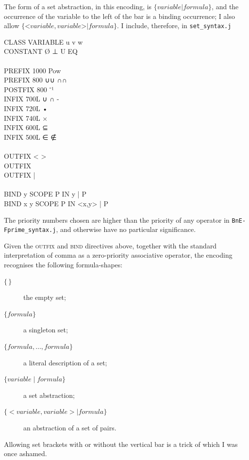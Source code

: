 The form of a set abstraction, in this encoding, is $\{ \mathit{variable} | \mathit{formula} \}$, and the occurrence of the variable to the left of the bar is a binding occurrence; I also allow $\{ \texttt{<}\mathit{variable},\mathit{variable}\texttt{>} | \mathit{formula} \}$. I include, therefore, in \texttt{set\_syntax.j}
\begin{japeish}
CLASS VARIABLE u v w \\
CONSTANT Ø ⊥ U EQ \\
\\
PREFIX  1000            Pow \\
PREFIX  800             ∪∪ ∩∩ \\
POSTFIX 800             ⁻¹ \\
INFIX           700L            ∪ ∩ - \\
INFIX           720L            • \\
INFIX           740L            × \\
INFIX           600L            ⊆ \\
INFIX           500L            ∈ ∉ \\
\\
OUTFIX < > \\
OUTFIX { } \\
OUTFIX { | } \\
 \\
BIND y SCOPE P IN { y | P } \\
BIND x y SCOPE P IN { <x,y> | P }
\end{japeish}
The priority numbers chosen are higher than the priority of any operator in \texttt{BnE-Fprime\_syntax.j}, and otherwise have no particular significance. 

Given the \textsc{outfix} and \textsc{bind} directives above, together with the standard interpretation of comma as a zero-priority associative operator, the encoding recognises the following formula-shapes:
\begin{description}
\item[$\{\,\}$] the empty set;
\item[$\{ \mathit{formula} \}$] a singleton set;
\item[$\{ \mathit{formula},\dots,\mathit{formula} \}$] a literal description of a set;
\item[$\{ \mathit{variable} \mid \mathit{formula} \}$] a set abstraction;
\item[$\{ <\!\mathit{variable}, \mathit{variable}\!> \mid \mathit{formula} \}$] an abstraction of a set of pairs.
\end{description}
Allowing set brackets with or without the vertical bar is a trick of which I was once ashamed.

